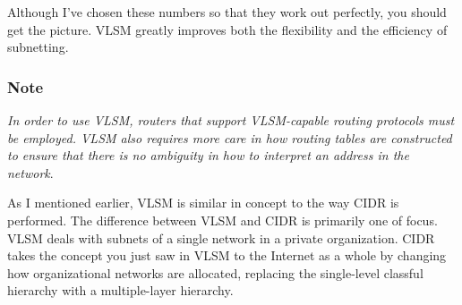 Although I've chosen these numbers so that they work out perfectly, you
should get the picture. VLSM greatly improves both the flexibility and
the efficiency of subnetting.

\subsubsection[Note]{\texorpdfstring{\protect\hypertarget{ch18s08.htmlux5cux23note-76}{}{}Note}{Note}}

{\emph{In order to use VLSM, routers that support VLSM-capable routing
protocols must be employed. VLSM also requires more care in how routing
tables are constructed to ensure that there is no ambiguity in how to
interpret an address in the
network}}\protect\hypertarget{ch18s08.htmlux5cux23idx-CHP-18-0745}{}{}.

As I mentioned earlier, VLSM is similar in concept to the way CIDR is
performed. The difference between VLSM and CIDR is primarily one of
focus. VLSM deals with subnets of a single network in a private
organization. CIDR takes the concept you just saw in VLSM to the
Internet as a whole by changing how organizational networks are
allocated, replacing the single-level classful hierarchy with a
multiple-layer hierarchy.





